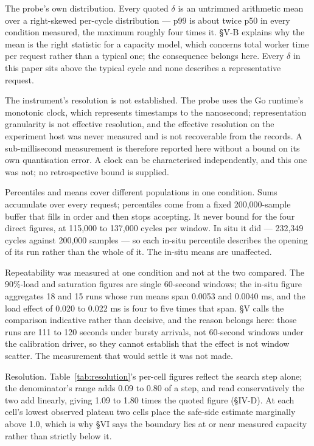 \documentclass{ieeeaccess}
\begin{document}
The probe's own distribution. Every quoted $\delta$ is an untrimmed arithmetic mean over a right-skewed per-cycle distribution --- p99 is about twice p50 in every condition measured, the maximum roughly four times it. \S{}V-B explains why the mean is the right statistic for a capacity model, which concerns total worker time per request rather than a typical one; the consequence belongs here. Every $\delta$ in this paper sits above the typical cycle and none describes a representative request.

The instrument's resolution is not established. The probe uses the Go runtime's monotonic clock, which represents timestamps to the nanosecond; representation granularity is not effective resolution, and the effective resolution on the experiment host was never measured and is not recoverable from the records. A sub-millisecond measurement is therefore reported here without a bound on its own quantisation error. A clock can be characterised independently, and this one was not; no retrospective bound is supplied.

Percentiles and means cover different populations in one condition. Sums accumulate over every request; percentiles come from a fixed 200,000-sample buffer that fills in order and then stops accepting. It never bound for the four direct figures, at 115,000 to 137,000 cycles per window. In situ it did --- 232,349 cycles against 200,000 samples --- so each in-situ percentile describes the opening of its run rather than the whole of it. The in-situ means are unaffected.

Repeatability was measured at one condition and not at the two compared. The 90\%-load and saturation figures are single 60-second windows; the in-situ figure aggregates 18 and 15 runs whose run means span 0.0053 and 0.0040 ms, and the load effect of 0.020 to 0.022 ms is four to five times that span. \S{}V calls the comparison indicative rather than decisive, and the reason belongs here: those runs are 111 to 120 seconds under bursty arrivals, not 60-second windows under the calibration driver, so they cannot establish that the effect is not window scatter. The measurement that would settle it was not made.

Resolution. Table~\ref{tab:resolution}'s per-cell figures reflect the search step alone; the denominator's range adds 0.09 to 0.80 of a step, and read conservatively the two add linearly, giving 1.09 to 1.80 times the quoted figure (\S{}IV-D). At each cell's lowest observed plateau two cells place the safe-side estimate marginally above 1.0, which is why \S{}VI says the boundary lies at or near measured capacity rather than strictly below it.
\end{document}
